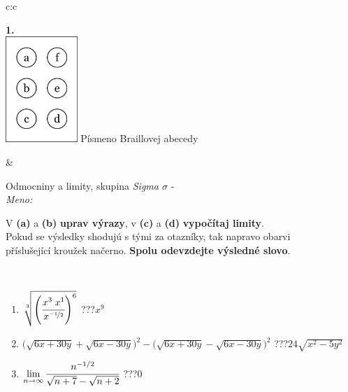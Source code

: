 \documentclass[10pt]{report}
\begin{document}
\begin{tabular}{c:c}
\begin{minipage}[c][104.5mm][t]{0.5\linewidth}
\begin{center}
\begin{minipage}{0.20\linewidth}
\begin{center}
{\Huge\bfseries 1.} \\[2mm]
\includegraphics[height=40mm]{../images/braille.png}
{\small Písmeno Braillovej abecedy}
\end{center}
\end{minipage}
\end{center}
\end{minipage}
&
\begin{minipage}[c][104.5mm][t]{0.5\linewidth}
\begin{center}
\vspace{7mm}
{\huge Odmocniny a limity, skupina \textit{Sigma $\sigma$} -}\\[5mm]
\textit{Meno:}\phantom{xxxxxxxxxxxxxxxxxxxxxxxxxxxxxxxxxxxxxxxxxxxxxxxxxxxxxxxxxxxxxxxxx}\\[5mm]
\begin{minipage}{0.95\linewidth}
\begin{center}
V \textbf{(a)} a \textbf{(b)} \textbf{uprav výrazy}, v \textbf{(c)} a \textbf{(d)} \textbf{vypočítaj limity}.\\Pokud se výsledky shodujú s tými za otazníky, tak napravo obarvi\\příslušející kroužek načerno. \textbf{Spolu odevzdejte výsledné slovo}.
\end{center}
\end{minipage}
\\[1mm]
\begin{minipage}{0.79\linewidth}
\begin{center}
\begin{varwidth}{\linewidth}
\begin{enumerate}
\small
\item $\sqrt[3]{\left(\cfrac{x^{3}\;x^{1}}{x^{\nicefrac{-1}{2}}}\right)^{6}}$\quad \dotfill\; ???\;\dotfill \quad $x^{9}$
\item {\footnotesize{\scriptsize$\big(\sqrt{6x+30y}+\sqrt{6x-30y}\big)^2-\big(\sqrt{6x+30y}-\sqrt{6x-30y}\big)^2$}\quad \dotfill\; ???\;\dotfill \quad $24\sqrt{x^2-5y^2}$}
\item $\lim\limits_{n\to\infty}\cfrac{n^{-1/2}}{\sqrt{n+7}-\sqrt{n+2}}$\quad \dotfill\; ???\;\dotfill \quad $0$

\end{enumerate}
\end{varwidth}
\end{center}
\end{minipage}
\end{center}
\end{minipage}
\end{tabular}
\end{document}
